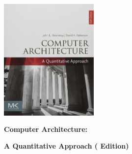 \hfill
\begin{minipage}{.35\textwidth}
    \begin{center}
        \includegraphics[height=6cm]{introduction/images/comp_arch_quant_approach.jpg}
    \end{center}
    \centerline{\textbf{Computer Architecture:}}
    \centerline{\textbf{A Quantitative Approach ( Edition)}}
\end{minipage}

